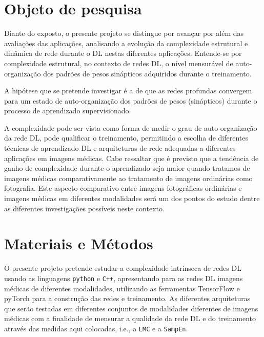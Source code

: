 \documentclass[
	12pt,				%
	openany,oneside,
	a4paper,			%
	english,			%
	brazil,				%
	]{abntex2}
\begin{document}
\chapter{Objeto de pesquisa}
Diante do exposto, o presente projeto se distingue por avançar por além das avaliações das aplicações, analisando a evolução da complexidade estrutural e dinâmica de rede durante o DL nestas diferentes aplicações. Entende-se por complexidade estrutural, no contexto de redes DL, o nível mensurável de auto-organização dos padrões de pesos sinápticos adquiridos durante o treinamento.

A hipótese que se pretende investigar é a de que as redes profundas convergem para um estado de auto-organização dos padrões de pesos (sinápticos) durante o processo de aprendizado supervisionado. 

A complexidade pode ser vista como forma de medir o grau de auto-organização da rede DL, pode qualificar o treinamento, permitindo a escolha de diferentes técnicas de aprendizado DL e arquiteturas de rede adequadas a diferentes aplicações em imagens médicas. Cabe ressaltar que é previsto que a tendência de ganho de complexidade durante o aprendizado seja maior quando tratamos de imagens médicas comparativamente ao tratamento de imagens ordinárias como fotografia. Este aspecto comparativo entre imagens fotográficas ordinárias e imagens médicas em diferentes modalidades será um dos pontos do estudo dentre as diferentes investigações possíveis neste contexto.

\chapter{Materiais e Métodos}
O presente projeto pretende estudar a complexidade intrínseca de redes DL usando as linguagens \texttt{python} e \texttt{C++}, apresentando para as redes DL imagens médicas de diferentes modalidades, utilizando as ferramentas TensorFlow e pyTorch para a construção das redes e treinamento. As diferentes arquiteturas que serão testadas em diferentes conjuntos de modalidades diferentes de imagens médicas com a finalidade de mensurar a qualidade da rede DL e do treinamento através das medidas aqui colocadas, i.e., a \texttt{LMC} e a \texttt{SampEn}.
\end{document}
